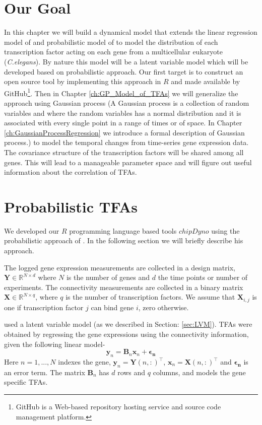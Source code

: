 \section{Our Goal}
In this chapter we will build a dynamical model that extends the linear regression model of \cite{Liao:2003} and probabilistic model of \cite{Sanguinetti:2006} to model the distribution of each transcription factor acting on each gene from a multicellular eukaryote (\textit{C.elegans}). By nature this model will be a latent variable model which will be developed based on probabilistic approach. Our first target is to construct an open source tool by implementing this approach in $R$ and made available by GitHub\footnote{GitHub is a Web-based repository hosting service and source code management platform.}. Then in Chapter \ref{ch:GP_Model_of_TFAs} we will generalize the approach using Gaussian process (A Gaussian process is a collection of random variables and where the random variables has a normal distribution and it is associated with every single point in a range of times or of space. In Chapter \ref{ch:GaussianProcessRegression} we introduce a formal description of Gaussian process.) to model the temporal changes from time-series gene expression data. The covariance structure of the transcription factors will be shared among all genes. This will lead to a manageable parameter space and will figure out useful information about the correlation of TFAs.

\section{Probabilistic TFAs}\label{sec:Probabilistic_TFA}
We developed our $R$ programming language based tools $chipDyno$ using the probabilistic approach of \cite{Sanguinetti:2006}. In the following section we will briefly describe his approach.

The logged gene expression measurements are collected in a design matrix, $\textbf{Y} \in \mathbb{R}^{ N \times d}$ where $N$ is the number of genes and $d$ the time points or number of experiments. 
The connectivity measurements are collected in a binary matrix $\textbf{X} \in \mathbb{R} ^ {N \times q}$, where $q$ is the number of transcription factors. We assume that $\textbf{X}_{i,j}$ is one 
if transcription factor $j$ can bind gene $i$, zero otherwise.

\cite{Sanguinetti:2006} used a latent variable model (as we described in Section: \ref{sec:LVM}). TFAs were obtained by regressing the gene expressions using the connectivity information, given the following linear model- 
\begin{equation} \label{eq:linear_model_TFA}
\textbf{y}_n = \textbf{B}_n \textbf{x}_n + \boldsymbol{\epsilon_{n}}
\end{equation}
Here $n = 1, . . . ,N$ indexes the gene, $\textbf{y}_n =\textbf{Y}(n,:)^{\top}$, $\textbf{x}_n=\textbf{X}(n,:)^{\top}$ and $\boldsymbol{\epsilon_{n}}$ is an error term. The matrix $\textbf{B}_n$ has $d$ rows and $q$ columns, and models the gene specific TFAs.

